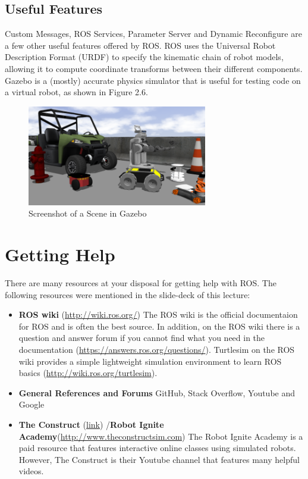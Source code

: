 \documentclass[twoside]{article}
\begin{document}
\subsection{Useful Features}
Custom Messages, ROS Services, Parameter Server and Dynamic Reconfigure are a few other useful features offered by ROS. ROS uses the Universal Robot Description Format (URDF) to specify the kinematic chain of robot models, allowing it to compute coordinate transforms between their different components. Gazebo is a (mostly) accurate physics simulator that is useful for testing code on a virtual robot, as shown in Figure 2.6.
\begin{figure}[ht]
\centering
\includegraphics[width=0.7\textwidth]{Gazebo}
\caption{Screenshot of a Scene in Gazebo}
\end{figure}

\newpage
\section{Getting Help}\label{sec:help}

There are many resources at your disposal for getting help with ROS. The following resources were mentioned in the slide-deck of this lecture:

\begin{itemize}
\item \textbf{ROS wiki} (\url{http://wiki.ros.org/})
\newline
The ROS wiki is the official documentaion for ROS and is often the best source. In addition, on the ROS wiki there is a question and answer forum if you cannot find what you need in the documentation (\url{https://answers.ros.org/questions/}). Turtlesim on the ROS wiki provides a simple lightweight  simulation environment to learn ROS basics (\url{http://wiki.ros.org/turtlesim}).

\item \textbf{General References and Forums}
\newline
GitHub, Stack Overflow, Youtube and Google
\item \textbf{The Construct} (\href{https://www.youtube.com/channel/UCt6Lag-vv25fTX3e11mVY1Q}{link}) /\textbf{Robot Ignite Academy}(\url{http://www.theconstructsim.com})
\newline
The Robot Ignite Academy is a paid resource that features interactive online classes using simulated robots. However, The Construct is their Youtube channel that features many helpful videos.
\end{itemize}
\end{document}
